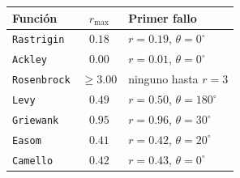 \begin{tabular}{l c l}
\toprule
\rowcolor{Azul1!50}
Función & $r_{\max}$ & Primer fallo \\
\midrule
\texttt{Rastrigin} & $0.18$ & $r=0.19$, $\theta=0^\circ$ \\
\texttt{Ackley} & $0.00$ & $r=0.01$, $\theta=0^\circ$ \\
\texttt{Rosenbrock} & $\ge 3.00$ & ninguno hasta $r=3$ \\
\texttt{Levy} & $0.49$ & $r=0.50$, $\theta=180^\circ$ \\
\texttt{Griewank} & $0.95$ & $r=0.96$, $\theta=30^\circ$ \\
\texttt{Easom} & $0.41$ & $r=0.42$, $\theta=20^\circ$ \\
\texttt{Camello} & $0.42$ & $r=0.43$, $\theta=0^\circ$ \\
\bottomrule
\end{tabular}
